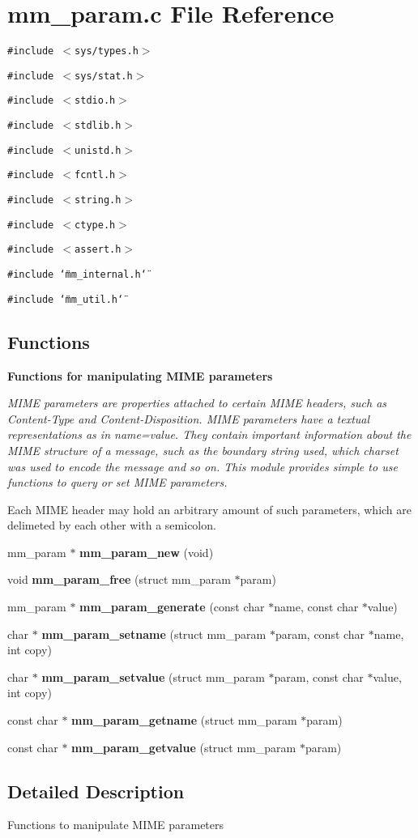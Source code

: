 \section{mm\_\-param.c File Reference}
\label{mm__param_8c}
{\tt \#include $<$sys/types.h$>$}\par
{\tt \#include $<$sys/stat.h$>$}\par
{\tt \#include $<$stdio.h$>$}\par
{\tt \#include $<$stdlib.h$>$}\par
{\tt \#include $<$unistd.h$>$}\par
{\tt \#include $<$fcntl.h$>$}\par
{\tt \#include $<$string.h$>$}\par
{\tt \#include $<$ctype.h$>$}\par
{\tt \#include $<$assert.h$>$}\par
{\tt \#include \char`\"{}mm\_\-internal.h\char`\"{}}\par
{\tt \#include \char`\"{}mm\_\-util.h\char`\"{}}\par
\subsection*{Functions}
\begin{Indent}{\bf Functions for manipulating MIME parameters}\par
{\em MIME parameters are properties attached to certain MIME headers, such as Content-Type and Content-Disposition. MIME parameters have a textual representations as in {\em name=value\/}. They contain important information about the MIME structure of a message, such as the boundary string used, which charset was used to encode the message and so on. This module provides simple to use functions to query or set MIME parameters.

Each MIME header may hold an arbitrary amount of such parameters, which are delimeted by each other with a semicolon. }\begin{CompactItemize}
\item 
mm\_\-param $\ast$ {\bf mm\_\-param\_\-new} (void)
\item 
void {\bf mm\_\-param\_\-free} (struct mm\_\-param $\ast$param)
\item 
mm\_\-param $\ast$ {\bf mm\_\-param\_\-generate} (const char $\ast$name, const char $\ast$value)
\item 
char $\ast$ {\bf mm\_\-param\_\-setname} (struct mm\_\-param $\ast$param, const char $\ast$name, int copy)
\item 
char $\ast$ {\bf mm\_\-param\_\-setvalue} (struct mm\_\-param $\ast$param, const char $\ast$value, int copy)
\item 
const char $\ast$ {\bf mm\_\-param\_\-getname} (struct mm\_\-param $\ast$param)
\item 
const char $\ast$ {\bf mm\_\-param\_\-getvalue} (struct mm\_\-param $\ast$param)
\end{CompactItemize}
\end{Indent}


\subsection{Detailed Description}
Functions to manipulate MIME parameters 